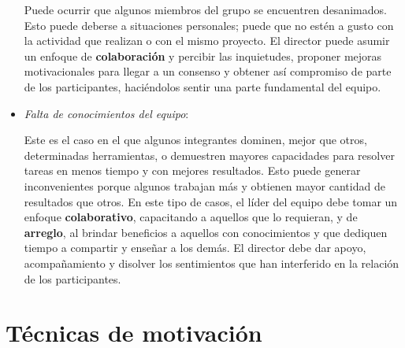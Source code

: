 \begin{itemize}
Puede ocurrir que algunos miembros del grupo se encuentren desanimados.
Esto puede deberse a situaciones personales; puede que no estén a gusto con la actividad que realizan o con el mismo proyecto.
El director puede asumir un enfoque de \textbf{colaboración} y percibir las inquietudes, proponer mejoras motivacionales para llegar a un consenso y obtener así compromiso de parte de los participantes, haciéndolos sentir una parte fundamental del equipo.

\item \textit{Falta de conocimientos del equipo}:

Este es el caso en el que algunos integrantes dominen, mejor que otros, determinadas herramientas, o demuestren mayores capacidades para resolver tareas en menos tiempo y con mejores resultados.
Esto puede generar inconvenientes porque algunos trabajan más y obtienen mayor cantidad de resultados que otros.
En este tipo de casos, el líder del equipo debe tomar un enfoque \textbf{colaborativo}, capacitando a aquellos que lo requieran, y de \textbf{arreglo}, al brindar beneficios a aquellos con conocimientos y que dediquen tiempo a compartir y enseñar a los demás.
El director debe dar apoyo, acompañamiento y disolver los sentimientos que han interferido en la relación de los participantes.


\end{itemize}

\newpage

\section{Técnicas de motivación}

